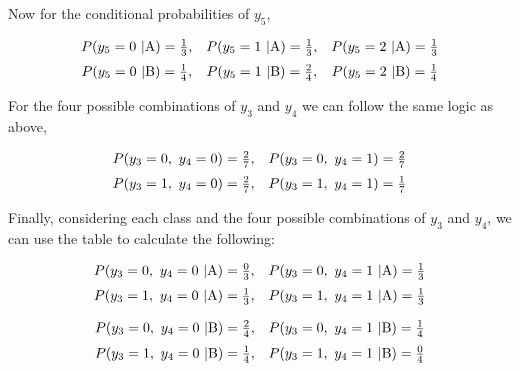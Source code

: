 \documentclass[12pt]{article}
\begin{document}
\begin{enumerate}[leftmargin=\labelsep]
\begin{enumerate}
          Now for the conditional probabilities of $y_5$,

          \[
              \begin{array}{ccc}
                  P(y_5 = 0 \ | \text{A}) = \frac{1}{3}, &
                  P(y_5 = 1 \ | \text{A}) = \frac{1}{3}, &
                  P(y_5 = 2 \ | \text{A}) = \frac{1}{3}    \\[\medskipamount]
                  P(y_5 = 0 \ | \text{B}) = \frac{1}{4}, &
                  P(y_5 = 1 \ | \text{B}) = \frac{2}{4}, &
                  P(y_5 = 2 \ | \text{B}) = \frac{1}{4}
              \end{array}
          \]

          For the four possible combinations of $y_3$ and $y_4$ we can follow
          the same logic as above,

          \[
              \begin{array}{cc}
                  P(y_3 = 0, \ y_4 = 0) = \frac{2}{7}, &
                  P(y_3 = 0, \ y_4 = 1) = \frac{2}{7}    \\[\medskipamount]
                  P(y_3 = 1, \ y_4 = 0) = \frac{2}{7}, &
                  P(y_3 = 1, \ y_4 = 1) = \frac{1}{7}
              \end{array}
          \]

          Finally, considering each class and the four possible combinations
          of $y_3$ and $y_4$, we can use the table to calculate the following:

          \[
              \begin{array}{cc}
                  P(y_3 = 0, \ y_4 = 0 \ | \text{A}) = \frac{0}{3}, &
                  P(y_3 = 0, \ y_4 = 1 \ | \text{A}) = \frac{1}{3}    \\[\medskipamount]
                  P(y_3 = 1, \ y_4 = 0 \ | \text{A}) = \frac{1}{3}, &
                  P(y_3 = 1, \ y_4 = 1 \ | \text{A}) = \frac{1}{3}
              \end{array}
          \]

          \[
              \begin{array}{cc}
                  P(y_3 = 0, \ y_4 = 0 \ | \text{B}) = \frac{2}{4}, &
                  P(y_3 = 0, \ y_4 = 1 \ | \text{B}) = \frac{1}{4}    \\[\medskipamount]
                  P(y_3 = 1, \ y_4 = 0 \ | \text{B}) = \frac{1}{4}, &
                  P(y_3 = 1, \ y_4 = 1 \ | \text{B}) = \frac{0}{4}
              \end{array}
          \]


\end{enumerate}
\end{enumerate}
\end{document}
